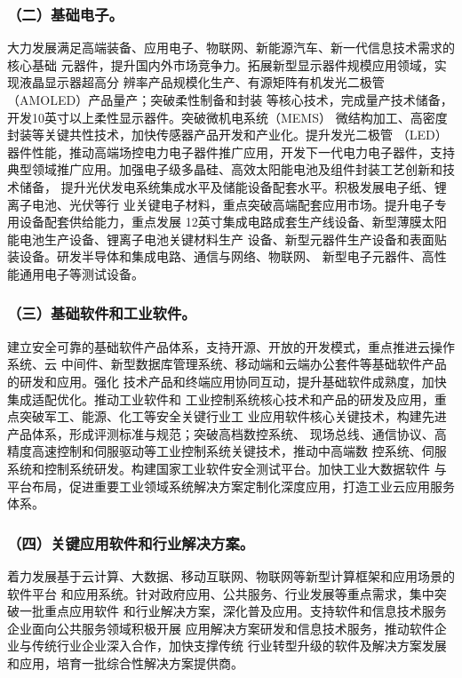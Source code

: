 \documentclass[11pt]{ctexart}
\begin{document}
{{{{\subsubsection{（二）基础电子。}
\label{sec:orgc7fcdb2}

大力发展满足高端装备、应用电子、物联网、新能源汽车、新一代信息技术需求的核心基础
元器件，提升国内外市场竞争力。拓展新型显示器件规模应用领域，实现液晶显示器超高分
辨率产品规模化生产、有源矩阵有机发光二极管（AMOLED）产品量产；突破柔性制备和封装
等核心技术，完成量产技术储备，开发10英寸以上柔性显示器件。突破微机电系统（MEMS）
微结构加工、高密度封装等关键共性技术，加快传感器产品开发和产业化。提升发光二极管
（LED）器件性能，推动高端场控电力电子器件推广应用，开发下一代电力电子器件，支持
典型领域推广应用。加强电子级多晶硅、高效太阳能电池及组件封装工艺创新和技术储备，
提升光伏发电系统集成水平及储能设备配套水平。积极发展电子纸、锂离子电池、光伏等行
业关键电子材料，重点突破高端配套应用市场。提升电子专用设备配套供给能力，重点发展
12英寸集成电路成套生产线设备、新型薄膜太阳能电池生产设备、锂离子电池关键材料生产
设备、新型元器件生产设备和表面贴装设备。研发半导体和集成电路、通信与网络、物联网、
新型电子元器件、高性能通用电子等测试设备。


\subsubsection{（三）基础软件和工业软件。}
\label{sec:orgd79773c}
建立安全可靠的基础软件产品体系，支持开源、开放的开发模式，重点推进云操作系统、云
中间件、新型数据库管理系统、移动端和云端办公套件等基础软件产品的研发和应用。强化
技术产品和终端应用协同互动，提升基础软件成熟度，加快集成适配优化。推动工业软件和
工业控制系统核心技术和产品的研发及应用，重点突破军工、能源、化工等安全关键行业工
业应用软件核心关键技术，构建先进产品体系，形成评测标准与规范；突破高档数控系统、
现场总线、通信协议、高精度高速控制和伺服驱动等工业控制系统关键技术，推动中高端数
控系统、伺服系统和控制系统研发。构建国家工业软件安全测试平台。加快工业大数据软件
与平台布局，促进重要工业领域系统解决方案定制化深度应用，打造工业云应用服务体系。


\subsubsection{（四）关键应用软件和行业解决方案。}
\label{sec:org27288c2}

着力发展基于云计算、大数据、移动互联网、物联网等新型计算框架和应用场景的软件平台
和应用系统。针对政府应用、公共服务、行业发展等重点需求，集中突破一批重点应用软件
和行业解决方案，深化普及应用。支持软件和信息技术服务企业面向公共服务领域积极开展
应用解决方案研发和信息技术服务，推动软件企业与传统行业企业深入合作，加快支撑传统
行业转型升级的软件及解决方案发展和应用，培育一批综合性解决方案提供商。

}}}}
\end{document}

